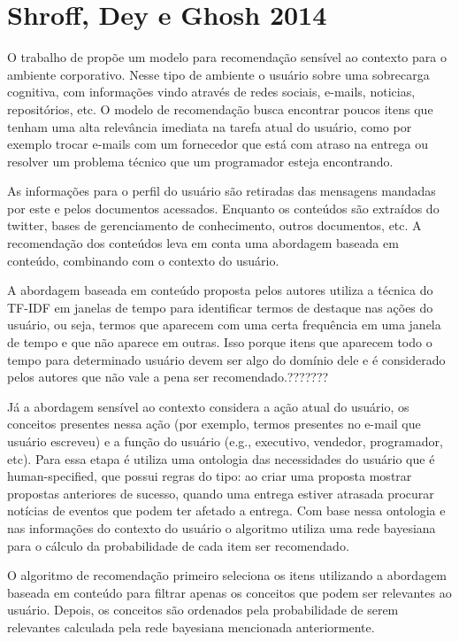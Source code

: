 \section{Shroff, Dey e Ghosh 2014}

O trabalho de  propõe um modelo para recomendação sensível ao contexto para o ambiente
corporativo. Nesse tipo de ambiente o usuário sobre uma sobrecarga cognitiva, com informações vindo através de redes
sociais, e-mails, noticias, repositórios, etc. O modelo de recomendação busca encontrar poucos itens que tenham uma alta
relevância imediata na tarefa atual do usuário, como por exemplo trocar e-mails com um fornecedor que está com atraso
na entrega ou resolver um problema técnico que um programador esteja encontrando.

As informações para o perfil do usuário são retiradas das mensagens mandadas por este e pelos documentos acessados.
Enquanto os conteúdos são extraídos do twitter, bases de gerenciamento de conhecimento, outros documentos, etc. A
recomendação dos conteúdos leva em conta uma abordagem baseada em conteúdo, combinando com o contexto do usuário.

A abordagem baseada em conteúdo proposta pelos autores utiliza a técnica do TF-IDF em janelas de tempo para identificar
termos de destaque nas ações do usuário, ou seja, termos que aparecem com uma certa frequência em uma janela de tempo
e que não aparece em outras. Isso porque itens que aparecem todo o tempo para determinado usuário devem ser algo do
domínio dele e é considerado pelos autores que não vale a pena ser recomendado.???????

Já a abordagem sensível ao contexto considera a ação atual do usuário, os conceitos presentes nessa ação (por exemplo,
termos presentes no e-mail que usuário escreveu) e a função do usuário (e.g., executivo, vendedor, programador, etc).
Para essa etapa é utiliza uma ontologia das necessidades do usuário que é human-specified, que possui regras do tipo:
ao criar uma proposta mostrar propostas anteriores de sucesso, quando uma entrega estiver atrasada procurar notícias
de eventos que podem ter afetado a entrega. Com base nessa ontologia e nas informações do contexto do usuário o
algoritmo utiliza uma rede bayesiana para o cálculo da probabilidade de cada item ser recomendado.

O algoritmo de recomendação primeiro seleciona os itens utilizando a abordagem baseada em conteúdo para filtrar apenas
os conceitos que podem ser relevantes ao usuário. Depois, os conceitos são ordenados pela probabilidade de serem
relevantes calculada pela rede bayesiana mencionada anteriormente.

